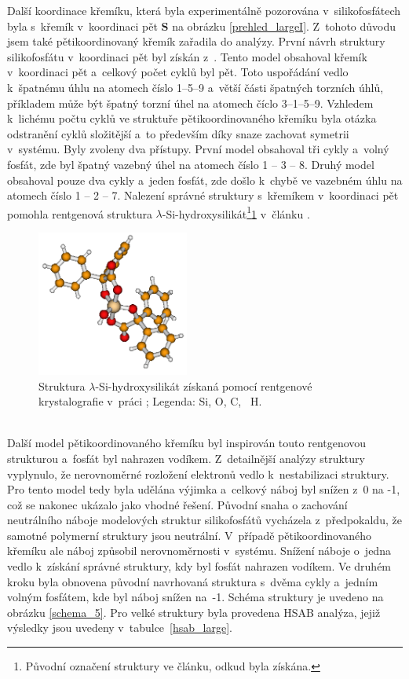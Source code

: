 \documentclass[
digital, %
table,   %
nolof,     %
nolot,     %
oneside,
]{fithesis3}
\begin{document}
Další koordinace křemíku, která byla experimentálně pozorována v~silikofosfátech byla s~křemík v~koordinaci pět \textbf{S} na obrázku \ref{prehled_largeI}.  Z~tohoto důvodu jsem také pětikoordinovaný křemík zařadila do analýzy. První návrh struktury silikofosfátu v~koordinaci pět byl získán z~\cite{pinkas_sdeleni}. Tento model obsahoval křemík v~koordinaci pět a~celkový počet cyklů byl pět. Toto uspořádání vedlo k~špatnému úhlu na atomech číslo 1--5--9 a~větší části špatných torzních úhlů, příkladem může být špatný torzní úhel na atomech číclo 3--1--5--9.  Vzhledem k~lichému počtu cyklů ve struktuře pětikoordinovaného křemíku byla otázka odstranění cyklů složitější a~to především díky snaze zachovat symetrii v~systému. Byly zvoleny dva přístupy. První model obsahoval tři cykly a~volný fosfát, zde byl špatný vazebný úhel na atomech číslo 1 -- 3 -- 8. Druhý model obsahoval pouze dva cykly a~jeden fosfát, zde došlo k~chybě ve vazebném úhlu na atomech číslo 1 -- 2 -- 7. Nalezení správné struktury s~křemíkem v~koordinaci pět pomohla rentgenová struktura $\lambda$-Si-hydroxysilikát\footnote{Původní označení struktury ve článku, odkud byla získána.}\ref{rtg_5} v~článku \cite{rtg_5}.
\begin{figure}\begin{minipage}{\textwidth}
\begin{center}
\includegraphics[width=5cm]{rtg_5_koordinace.png}
\caption{Struktura $\lambda$-Si-hydroxysilikát získaná pomocí rentgenové krystalografie v~práci \cite{rtg_5};  Legenda:  Si,  O,  C, ~H.}
\label{rtg_5}
\end{center}\end{minipage}
\end{figure}\\

Další model pětikoordinovaného křemíku byl inspirován touto rentgenovou strukturou a~fosfát byl nahrazen vodíkem. Z~detailnější analýzy struktury vyplynulo, že nerovnoměrné rozložení elektronů vedlo k~nestabilizaci struktury. Pro tento model tedy byla udělána výjimka a~celkový náboj byl snížen z~0 na -1, což se nakonec ukázalo jako vhodné řešení. Původní snaha o zachování neutrálního náboje modelových struktur silikofosfátů vycházela z~předpokaldu, že samotné polymerní struktury jsou neutrální. V~případě pětikoordinovaného křemíku ale náboj způsobil nerovnoměrnosti v~systému. Snížení náboje o~jedna vedlo k~získání správné struktury, kdy byl fosfát nahrazen vodíkem. Ve druhém kroku byla obnovena původní navrhovaná struktura s~dvěma cykly a~jedním volným fosfátem, kde byl náboj snížen na~-1. Schéma struktury je uvedeno na obrázku \ref{schema_5}. Pro velké struktury byla provedena HSAB analýza, jejiž výsledky jsou uvedeny v~tabulce~\ref{hsab_large}.
\end{document}
